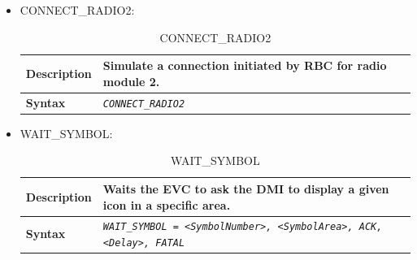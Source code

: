 \begin{itemize}
		\item CONNECT\_RADIO2:

			\begin{longtable}{|l|l|}
				\caption{CONNECT\_RADIO2}\\
				\hline

					\begin{minipage}[t]{0.22\linewidth} \textbf{Description} \end{minipage}
				&	\begin{minipage}[t]{0.78\linewidth} Simulate a connection initiated by RBC for radio module 2. \end{minipage} \\

				\hline

					\begin{minipage}[t]{0.22\linewidth} \textbf{Syntax}	\end{minipage}
				&	\begin{minipage}[t]{0.78\linewidth} \emph{\texttt{CONNECT\_RADIO2}} \end{minipage} \\

				\hline \hline

			\end{longtable}

		\item WAIT\_SYMBOL:

			\begin{longtable}{|l|l|}
				\caption{WAIT\_SYMBOL}\\
				\hline

					\begin{minipage}[t]{0.22\linewidth} \textbf{Description} \end{minipage}
				&	\begin{minipage}[t]{0.78\linewidth} Waits the EVC to ask the DMI to display a given icon in a specific area. \end{minipage} \\

				\hline

					\begin{minipage}[t]{0.22\linewidth} \textbf{Syntax}	\end{minipage}
				&	\begin{minipage}[t]{0.78\linewidth} \emph{\texttt{WAIT\_SYMBOL = <SymbolNumber>, <SymbolArea>, ACK, <Delay>, FATAL}} \end{minipage} \\


\end{longtable}
\end{itemize}
